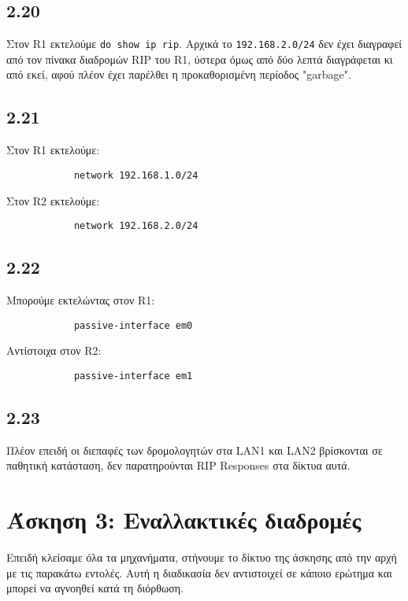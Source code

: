 \documentclass[a4paper, 12pt]{article}
\begin{document}
	\subsection*{2.20}
		Στον R1 εκτελούμε \verb|do show ip rip|. Αρχικά το \verb|192.168.2.0/24| δεν έχει διαγραφεί από τον πίνακα διαδρομών RIP του R1, ύστερα όμως από δύο λεπτά διαγράφεται κι από εκεί, αφού πλέον έχει παρέλθει η προκαθορισμένη περίοδος "garbage".

	\subsection*{2.21}
		Στον R1 εκτελούμε:
		
		\begin{verbatim}
			network 192.168.1.0/24
		\end{verbatim}
		
		Στον R2 εκτελούμε:
		
		\begin{verbatim}
			network 192.168.2.0/24
		\end{verbatim}

	\subsection*{2.22}
		Μπορούμε εκτελώντας στον R1:
		
		\begin{verbatim}
			passive-interface em0
		\end{verbatim}
		
		Αντίστοιχα στον R2:

		\begin{verbatim}
			passive-interface em1
		\end{verbatim}
	
	\subsection*{2.23}
		Πλέον επειδή οι διεπαφές των δρομολογητών στα LAN1 και LAN2 βρίσκονται σε παθητική κατάσταση, δεν παρατηρούνται RIP Responses στα δίκτυα αυτά.

\section*{Άσκηση 3: Εναλλακτικές διαδρομές}
	Επειδή κλείσαμε όλα τα μηχανήματα, στήνουμε το δίκτυο της άσκησης από την αρχή με τις παρακάτω εντολές. Αυτή η διαδικασία δεν αντιστοιχεί σε κάποιο ερώτημα και μπορεί να αγνοηθεί κατά τη διόρθωση.
	
\end{document}
